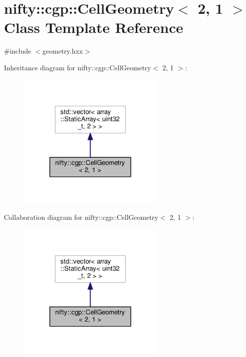 \hypertarget{classnifty_1_1cgp_1_1CellGeometry_3_012_00_011_01_4}{}\section{nifty\+:\+:cgp\+:\+:Cell\+Geometry$<$ 2, 1 $>$ Class Template Reference}
\label{classnifty_1_1cgp_1_1CellGeometry_3_012_00_011_01_4}


{\ttfamily \#include $<$geometry.\+hxx$>$}



Inheritance diagram for nifty\+:\+:cgp\+:\+:Cell\+Geometry$<$ 2, 1 $>$\+:\nopagebreak
\begin{figure}[H]
\begin{center}
\leavevmode
\includegraphics[width=203pt]{classnifty_1_1cgp_1_1CellGeometry_3_012_00_011_01_4__inherit__graph}
\end{center}
\end{figure}


Collaboration diagram for nifty\+:\+:cgp\+:\+:Cell\+Geometry$<$ 2, 1 $>$\+:\nopagebreak
\begin{figure}[H]
\begin{center}
\leavevmode
\includegraphics[width=203pt]{classnifty_1_1cgp_1_1CellGeometry_3_012_00_011_01_4__coll__graph}
\end{center}
\end{figure}
